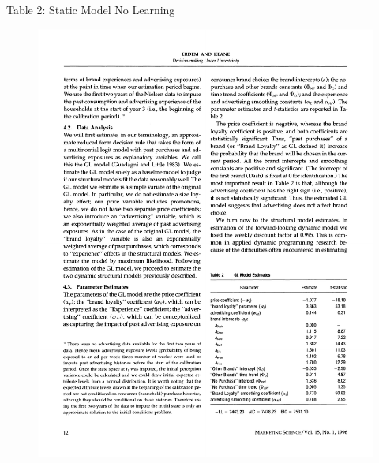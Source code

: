 \documentclass[xcolor=pdftex,dvipsnames,table,mathserif,aspectratio=169]{beamer}
\begin{document}
\begin{frame}{Table 2: Static Model No Learning} 
\begin{figure}[htbp]
\begin{center}
\includegraphics{resources/ek1.pdf}
\label{default}
\end{center}
\end{figure}
\end{frame}
\end{document}
